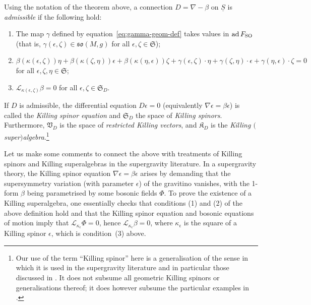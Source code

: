 \documentclass[pdftex]{sigma}
\numberwithin{equation}{section}
\newcommand{\fso}{\mathfrak{so}}
\newcommand{\fK}{\mathfrak{K}}
\newcommand{\fS}{\mathfrak{S}}
\newcommand{\fV}{\mathfrak{V}}
\newcommand{\eL}{\mathscr{L}}
\newcommand{\Sbundle}{\underline{S}}
\newcommand{\1}{\mathbbm{1}}
\DeclareMathOperator{\ad}{ad}
\begin{document}
\begin{Definition}\label{def:killing-spinor}
	Using the notation of the theorem above, a connection $D=\nabla-\beta$ on $\Sbundle$ is \emph{admissible} if the following hold:
	\begin{enumerate}\itemsep=0pt
		\item The map $\gamma$ defined by equation~\eqref{eq:gamma-geom-def} takes values in $\ad F_{\rm SO}$ (that is, $\gamma(\epsilon,\zeta)\in\fso(M,g)$ for all $\epsilon,\zeta\in\fS$); %

		\item $
\beta(\kappa(\epsilon,\zeta))\eta + \beta(\kappa(\zeta,\eta))\epsilon + \beta(\kappa(\eta,\epsilon))\zeta
				+ \gamma(\epsilon,\zeta)\cdot\eta + \gamma(\zeta,\eta)\cdot\epsilon +\gamma(\eta,\epsilon)\cdot\zeta
				= 0$ for all $\epsilon,\zeta,\eta\in\fS$; %

		\item $\eL_{\kappa(\epsilon,\zeta)}\beta = 0$ for all $\epsilon,\zeta\in\fS_D$. %
	\end{enumerate}
	If $D$ is admissible, the differential equation $D\epsilon=0$ (equivalently $\nabla\epsilon =\beta\epsilon$) is called the \emph{Killing spinor equation} and $\fS_D$ the space of \emph{Killing spinors}. Furthermore, $\fV_D$ is the space of \emph{restricted Killing vectors}, and $\fK_D$ is the \emph{Killing $($super$)$algebra}.\footnote{Our use of the term ``Killing spinor'' here is a generalisation of the sense in which it is used in the supergravity literature and in particular those discussed in \cite{Beckett2021,deMedeiros2016,deMedeiros2018,Figueroa-OFarrill2017_1,Figueroa-OFarrill2017}. It does not subsume all geometric Killing spinors or generalisations thereof; it does however subsume the particular examples in \cite{Figueroa-OFarrill2008_except}.}
\end{Definition}

Let us make some comments to connect the above with treatments of Killing spinors and Killing superalgebras in the supergravity literature. In a supergravity theory, the Killing spinor equation $\nabla\epsilon=\beta\epsilon$ arises by demanding that the supersymmetry variation (with parameter $\epsilon$) of the gravitino vanishes, with the 1-form $\beta$ being parametrised by some bosonic fields $\Phi$. To prove the existence of a Killing superalgebra, one essentially checks that conditions (1) and (2) of the above definition hold and that the Killing spinor equation and bosonic equations of motion imply that $\eL_{\kappa_\epsilon}\Phi=0$, hence $\eL_{\kappa_\epsilon}\beta=0$, where $\kappa_\epsilon$ is the square of a Killing spinor $\epsilon$, which is condition~(3) above.
\end{document}
